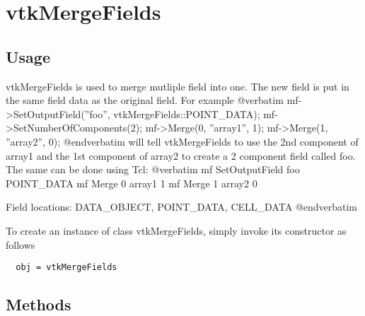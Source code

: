 \section{vtkMergeFields}

\subsection{Usage}

 vtkMergeFields is used to merge mutliple field into one.
 The new field is put in the same field data as the original field.
 For example
 @verbatim
 mf->SetOutputField(''foo'', vtkMergeFields::POINT\_DATA);
 mf->SetNumberOfComponents(2);
 mf->Merge(0, ''array1'', 1);
 mf->Merge(1, ''array2'', 0);
 @endverbatim
 will tell vtkMergeFields to use the 2nd component of array1 and
 the 1st component of array2 to create a 2 component field called foo.
 The same can be done using Tcl:
 @verbatim
 mf SetOutputField foo POINT\_DATA
 mf Merge 0 array1 1
 mf Merge 1 array2 0

 Field locations: DATA\_OBJECT, POINT\_DATA, CELL\_DATA
 @endverbatim

To create an instance of class vtkMergeFields, simply
invoke its constructor as follows
\begin{verbatim}
  obj = vtkMergeFields
\end{verbatim}
\subsection{Methods}

